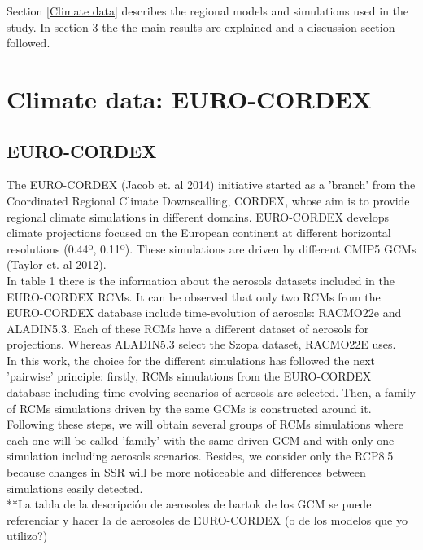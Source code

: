    Section \ref{Climate data} describes the regional models and simulations used in the study. In section 3 the the main results are explained and a discussion section followed.\\

\section{Climate data: EURO-CORDEX}

\subsection{EURO-CORDEX}

The EURO-CORDEX (Jacob et. al 2014) initiative started as a 'branch' from the Coordinated Regional Climate Downscalling, CORDEX, whose aim is to provide regional climate simulations in different domains. EURO-CORDEX develops climate projections focused on the European continent at different horizontal resolutions (0.44º, 0.11º). These simulations are driven by different CMIP5 GCMs (Taylor et. al 2012).\\

In table 1 there is the information about the aerosols datasets included in the EURO-CORDEX RCMs. It can be observed that only two RCMs from the EURO-CORDEX database include time-evolution of aerosols: RACMO22e and ALADIN5.3. Each of these RCMs have a different dataset of aerosols for projections. Whereas ALADIN5.3 select the Szopa dataset, RACMO22E uses.\\ 

In this work, the choice for the different simulations has followed the next 'pairwise' principle: firstly, RCMs simulations from the EURO-CORDEX database including time evolving scenarios of aerosols are selected. Then, a family of RCMs simulations driven by the same GCMs is constructed around it. Following these steps, we will obtain several groups of RCMs simulations where each one will be called 'family' with the same driven GCM and with only one simulation including aerosols scenarios. Besides, we consider only the RCP8.5 because changes in SSR will be more noticeable and differences between simulations easily detected.\\ 

**La tabla de la descripción de aerosoles de bartok de los GCM se puede referenciar y hacer la de aerosoles de EURO-CORDEX (o de los modelos que yo utilizo?)


